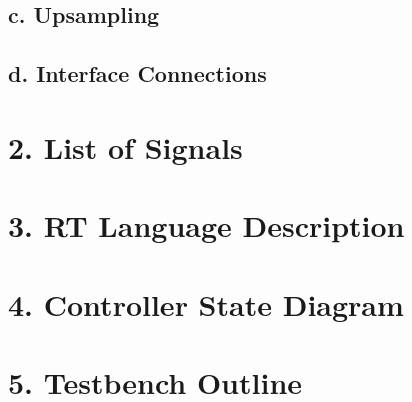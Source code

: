 \documentclass[11pt]{article}
\begin{document}
\subsection*{c. Upsampling}

\subsection*{d. Interface Connections}

\section*{2. List of Signals}

\section*{3. RT Language Description}

\section*{4. Controller State Diagram}

\section*{5. Testbench Outline}
\end{document}
